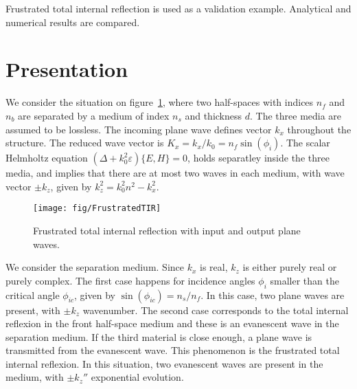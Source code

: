 

Frustrated total internal reflection is used as a validation example. 
Analytical and numerical results are compared.

\section{Presentation}

We consider the situation on figure~\ref{fig:FTIR}, where two half-spaces with indices $n_f$ and $n_b$ are separated by a medium of index $n_s$ and thickness $d$.
The three media are assumed to be lossless.
The incoming plane wave defines vector $k_x$ throughout the structure.
The reduced wave vector is $K_x=k_x/k_0=n_f \sin(\phi_i)$.
The scalar Helmholtz equation 
$(\Delta+k_0^2 \varepsilon)\{E,H\}=0$, 
holds separatley inside the three media, and implies that there are at most two waves in each medium, with wave vector $\pm k_z$, given by 
$k_z^2 = k_0^2 n^2 - k_x^2$.

\begin{figure}[!h]
\texttt{[image: fig/FrustratedTIR]}
\caption{\label{fig:FTIR}Frustrated total internal reflection with input and output plane waves. }
\end{figure}

We consider the separation medium.
Since $k_x$ is real, $k_z$ is either purely real or purely complex.
The first case happens for incidence angles $\phi_i$ smaller than the critical angle $\phi_{ic}$, given by $\sin(\phi_{ic}) = n_s/n_f$.
In this case, two plane waves are present, with $\pm k_z$ wavenumber.
The second case corresponds to the total internal reflexion in the front half-space medium and these is an evanescent wave in the separation medium.
If the third material is close enough, a plane wave is transmitted from the evanescent wave.
This phenomenon is the frustrated total internal reflexion.
In this situation, two evanescent waves are present in the medium, with $\pm k_z''$ exponential evolution.

